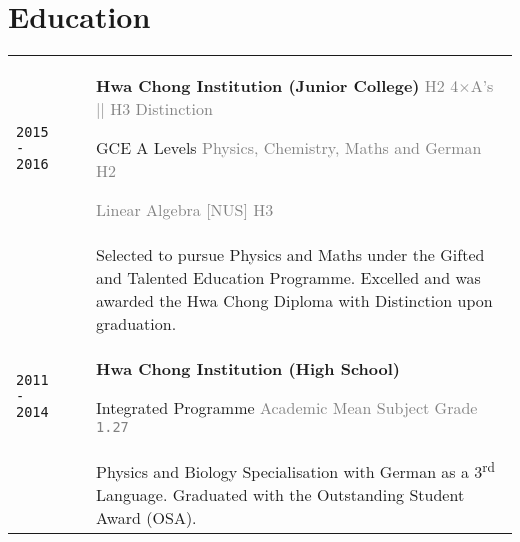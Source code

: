 \documentclass[11pt]{article}
\newcommand{\nummer}[1]{\texttt{\large #1}}
\begin{document}
\section{\textcolor{section_1}{Education}}
\vspace{-\baselineskip}
{
	\renewcommand{\arraystretch}{2}
	\begin{tabularx}{\textwidth}{@{}l p{0.3cm} X@{}}
		\texttt{\large 2015 - 2016} & & \textbf{Hwa Chong Institution (Junior College)} \hfill \textcolor{gray}{H2 4$\times$A's || H3 Distinction}\par GCE A Levels \hfill \textcolor{gray}{{\scriptsize Physics, Chemistry, Maths and German} \hspace{1em} H2}\par \hfill \textcolor{gray}{{\scriptsize Linear Algebra [NUS]} \hspace{1em} H3} \\[-0.5em]
		&& {\small Selected to pursue Physics and Maths under the Gifted and Talented Education Programme. Excelled and was awarded the Hwa Chong Diploma with Distinction upon graduation.} \\
		\texttt{\large 2011 - 2014} & & \textbf{Hwa Chong Institution (High School)} \par Integrated Programme \hfill \textcolor{gray}{{\scriptsize Academic Mean Subject Grade} \nummer{\large 1.27}} \\[-0.5em]
		&& {\small Physics and Biology Specialisation with German as a 3\textsuperscript{rd} Language. Graduated with the Outstanding Student Award {\footnotesize (OSA)}. }
	\end{tabularx}
}
\end{document}
